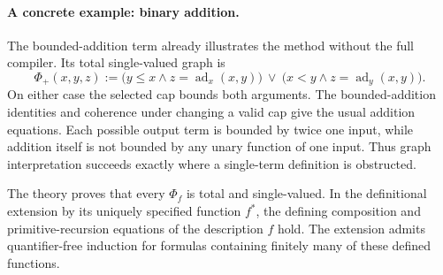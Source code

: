 \paragraph{A concrete example: binary addition.}
The bounded-addition term already illustrates the method without the full compiler. Its total single-valued graph is
\[
 \Phi_+(x,y,z):=
 \bigl(y\leq x\wedge z=\operatorname{ad}_x(x,y)\bigr)
 \ \vee\
 \bigl(x<y\wedge z=\operatorname{ad}_y(x,y)\bigr).
\]
On either case the selected cap bounds both arguments. The bounded-addition identities and coherence under changing a valid cap give the usual addition equations. Each possible output term is bounded by twice one input, while addition itself is not bounded by any unary function of one input. Thus graph interpretation succeeds exactly where a single-term definition is obstructed.

\begin{lemma}
\label{lem:internal-graph-computation}
The theory proves that every $\Phi_f$ is total and single-valued.
In the definitional extension by its uniquely specified function $f^*$,
the defining composition and primitive-recursion equations of the
description $f$ hold.  The extension admits quantifier-free induction
for formulas containing finitely many of these defined functions.
\end{lemma}

